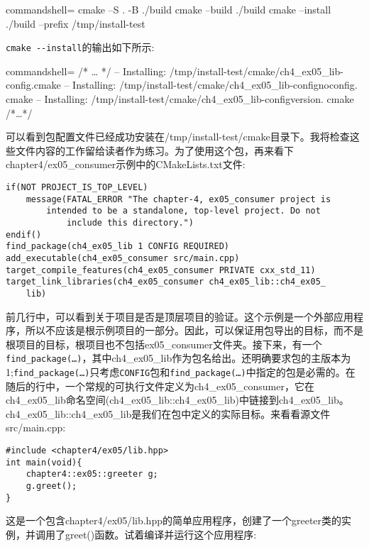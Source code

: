 \begin{tcblisting}{commandshell={}}
cmake –S . -B ./build
cmake --build ./build
cmake --install ./build --prefix /tmp/install-test
\end{tcblisting}

\texttt{cmake -{}-install}的输出如下所示:

\begin{tcblisting}{commandshell={}}
/* … */
-- Installing: /tmp/install-test/cmake/ch4_ex05_lib-config.cmake
-- Installing: /tmp/install-test/cmake/ch4_ex05_lib-confignoconfig.
cmake
-- Installing: /tmp/install-test/cmake/ch4_ex05_lib-configversion.
cmake
/*…*/
\end{tcblisting}

可以看到包配置文件已经成功安装在/tmp/install-test/cmake目录下。我将检查这些文件内容的工作留给读者作为练习。为了使用这个包，再来看下chapter4/ex05\_consumer示例中的CMakeLists.txt文件:

\begin{lstlisting}[style=styleCMake]
if(NOT PROJECT_IS_TOP_LEVEL)
	message(FATAL_ERROR "The chapter-4, ex05_consumer project is
		intended to be a standalone, top-level project. Do not
			include this directory.")
endif()
find_package(ch4_ex05_lib 1 CONFIG REQUIRED)
add_executable(ch4_ex05_consumer src/main.cpp)
target_compile_features(ch4_ex05_consumer PRIVATE cxx_std_11)
target_link_libraries(ch4_ex05_consumer ch4_ex05_lib::ch4_ex05_
	lib)
\end{lstlisting}

前几行中，可以看到关于项目是否是顶层项目的验证。这个示例是一个外部应用程序，所以不应该是根示例项目的一部分。因此，可以保证用包导出的目标，而不是根项目的目标，根项目也不包括ex05\_consumer文件夹。接下来，有一个\texttt{find\_package(…)}，其中ch4\_ex05\_lib作为包名给出。还明确要求包的主版本为1;\texttt{find\_package(…)}只考虑\texttt{CONFIG}包和\texttt{find\_package(…)}中指定的包是必需的。在随后的行中，一个常规的可执行文件定义为ch4\_ex05\_consumer，它在ch4\_ex05\_lib命名空间(ch4\_ex05\_lib::ch4\_ex05\_lib)中链接到ch4\_ex05\_lib。ch4\_ex05\_lib::ch4\_ex05\_lib是我们在包中定义的实际目标。来看看源文件src/main.cpp:

\begin{lstlisting}[style=styleCXX]
#include <chapter4/ex05/lib.hpp>
int main(void){
	chapter4::ex05::greeter g;
	g.greet();
}
\end{lstlisting}

这是一个包含chapter4/ex05/lib.hpp的简单应用程序，创建了一个greeter类的实例，并调用了greet()函数。试着编译并运行这个应用程序:

